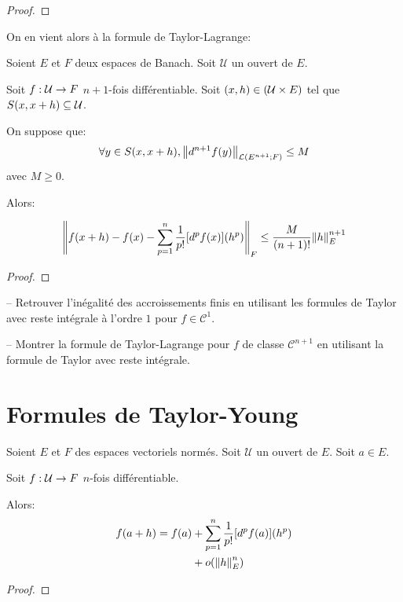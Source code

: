 \ifdefined\outputproof
\begin{proof}

\end{proof}
\fi

On en vient alors à la formule de Taylor-Lagrange:

\begin{theorem} 
	\label{theorem:taylor_lagrange_formula}
	Soient $E$ et $F$ deux espaces de Banach. Soit $\mathcal{U}$ un ouvert de
	$E$.

	Soit $f : \mathcal{U} \rightarrow F$ $n + 1$-fois différentiable.
	Soit $(x, h) \in (\mathcal{U} \times E)$ tel que $S(x, x + h)
	\subseteq \mathcal{U}$.

	On suppose que:
	\begin{equation*}
		\forall y \in S(x, x + h), \norm{d^{n +
		1}f(y)}_{\mathcal{L}(E^{n + 1}; F)} \leq M
	\end{equation*}
	avec $M \geq 0$.

	Alors:

	\begin{equation*}
		\norm{f(x + h) - f(x) - \displaystyle \sum_{p = 1}^{n}
		\frac{1}{p!} [d^{p}f(x)](h^{p})}_{F} \leq \frac{M}{(n + 1)!}
		\norm{h}_{E}^{n + 1}
	\end{equation*}
\end{theorem}

\ifdefined\outputproof
\begin{proof}

\end{proof}
\fi

\begin{exercice}
	-- Retrouver l'inégalité des accroissements finis en utilisant les formules
	de Taylor avec reste intégrale à l'ordre $1$ pour $f \in \mathcal{C}^{1}$.

	-- Montrer la formule de Taylor-Lagrange pour $f$ de classe $\mathcal{C}^{n
	+ 1}$ en utilisant la formule de Taylor avec reste intégrale.
\end{exercice}

\section{Formules de Taylor-Young}

\begin{theorem}
	\label{theorem:taylor_young_formula}
	Soient $E$ et $F$ des espaces vectoriels normés. Soit $\mathcal{U}$ un
	ouvert de $E$. Soit $a \in E$.

	Soit $f : \mathcal{U} \rightarrow F$ $n$-fois différentiable.

	Alors:
	\begin{align*}
		f(a + h) = f(a) & + \displaystyle \sum_{p = 1}^{n} \frac{1}{p!}
		[d^{p}f(a)] (h^{p}) \\
						& + o(\norm{h}_{E}^{n})
	\end{align*}
\end{theorem}

\ifdefined\outputproof
\begin{proof}

\end{proof}
\fi
